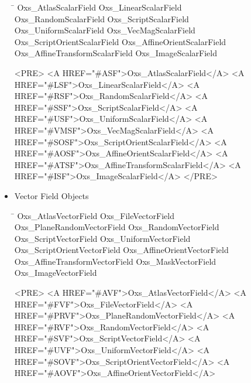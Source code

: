 \begin{itemize}
{\begin{tabbing}
   \hspace*{\tabcolwidth}\=\kill
      Oxs\_AtlasScalarField          \>  Oxs\_LinearScalarField       \\
      Oxs\_RandomScalarField         \>  Oxs\_ScriptScalarField       \\
      Oxs\_UniformScalarField        \>  Oxs\_VecMagScalarField       \\
      Oxs\_ScriptOrientScalarField   \>  Oxs\_AffineOrientScalarField \\
      Oxs\_AffineTransformScalarField \> Oxs\_ImageScalarField
   \end{tabbing}}
  \begin{rawhtml}
<PRE>
   <A HREF="#ASF">Oxs_AtlasScalarField</A>           <A HREF="#LSF">Oxs_LinearScalarField</A>
   <A HREF="#RSF">Oxs_RandomScalarField</A>          <A HREF="#SSF">Oxs_ScriptScalarField</A>
   <A HREF="#USF">Oxs_UniformScalarField</A>         <A HREF="#VMSF">Oxs_VecMagScalarField</A>
   <A HREF="#SOSF">Oxs_ScriptOrientScalarField</A>    <A HREF="#AOSF">Oxs_AffineOrientScalarField</A>
   <A HREF="#ATSF">Oxs_AffineTransformScalarField</A> <A HREF="#ISF">Oxs_ImageScalarField</A>
</PRE>
  \end{rawhtml}
\item Vector Field Objects
   {\tt\begin{tabbing}
   \hspace*{\tabcolwidth}\=\kill
   Oxs\_AtlasVectorField             \>  Oxs\_FileVectorField         \\
   Oxs\_PlaneRandomVectorField       \>  Oxs\_RandomVectorField       \\
   Oxs\_ScriptVectorField            \>  Oxs\_UniformVectorField      \\
   Oxs\_ScriptOrientVectorField      \>  Oxs\_AffineOrientVectorField \\
   Oxs\_AffineTransformVectorField   \>  Oxs\_MaskVectorField         \\
   Oxs\_ImageVectorField
   \end{tabbing}}
  \begin{rawhtml}
<PRE>
   <A HREF="#AVF">Oxs_AtlasVectorField</A>           <A HREF="#FVF">Oxs_FileVectorField</A>
   <A HREF="#PRVF">Oxs_PlaneRandomVectorField</A>     <A HREF="#RVF">Oxs_RandomVectorField</A>
   <A HREF="#SVF">Oxs_ScriptVectorField</A>          <A HREF="#UVF">Oxs_UniformVectorField</A>
   <A HREF="#SOVF">Oxs_ScriptOrientVectorField</A>    <A HREF="#AOVF">Oxs_AffineOrientVectorField</A>

\end{rawhtml}
\end{itemize}
